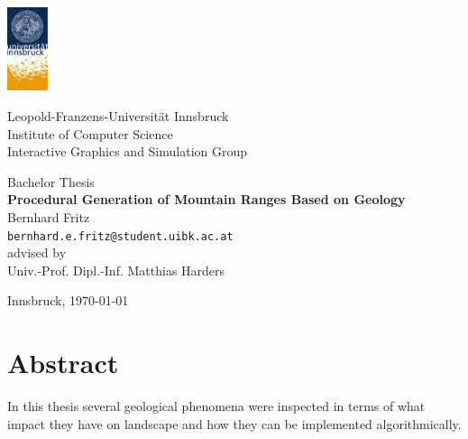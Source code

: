 \documentclass[11pt,a4paper,twoside,openright]{report}
\begin{document}

\begin{titlepage} %

\begin{center}
\includegraphics[width=1.2cm]{images/uibk}

\begin{large}
Leopold-Franzens-Universität Innsbruck\\[5mm]
Institute of Computer Science\\
Interactive Graphics and Simulation Group\\[25mm]
\end{large}

Bachelor Thesis\\[15mm]

{\LARGE \bf Procedural Generation of Mountain Ranges Based on Geology}\\[15mm]

Bernhard Fritz\\
\texttt{bernhard.e.fritz@student.uibk.ac.at}\\[35mm]

advised by\\
Univ.-Prof. Dipl.-Inf. Matthias Harders\\[10mm]

\vfill

Innsbruck, \today
\end{center}

\end{titlepage}





\chapter*{Abstract}
In this thesis several geological phenomena were inspected in terms of what impact they have on landscape and how they can be implemented algorithmically.
\end{document}
